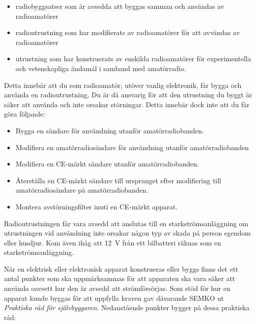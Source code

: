 \begin{itemize}
  \item radiobyggsatser som är avsedda att byggas samman och användas av
  radioamatörer
  \item radioutrustning som har modifierats av radioamatörer för att
  avvändas av radioamatörer
  \item utrustning som har konstruerats av enskilda radioamatörer för
  experimentella och vetenskapliga ändamål i samband med amatörradio.
\end{itemize}

Detta innebär att du som radioamatör, utöver vanlig elektronik, får bygga
och använda en radioutrustning.
Du är då ansvarig för att den utrustning du byggt är säker att använda och inte
orsakar störningar.
Detta innebär dock inte att du får göra följande:

\begin{itemize}
  \item Bygga en sändare för användning utanför amatörradiobanden.
  \item Modifiera en amatörradiosändare för användning utanför amatörradiobanden
  \item Modifiera en CE-märkt sändare utanför amatörradiobanden.
  \item Återställa en CE-märkt sändare till ursprunget efter modifiering till
    amatörradiosändare på amatörradiobanden.
  \item Montera avstörningsfilter inuti en CE-märkt apparat.
\end{itemize}

Radioutrustningen får vara avsedd att anslutas till en starkströmsanläggning
om utrustningen vid användning inte orsakar någon typ av skada på person
egendom eller husdjur.
Kom även ihåg att \qty{12}{\volt} från ett bilbatteri räknas som en
starkströmsanläggning.

När en elektrisk eller elektronisk apparat konstrueras eller byggs finns det
ett antal punkter som ska uppmärksammas för att apparaten ska vara säker att
använda oavsett hur den är avsedd att strömförsörjas.
Som stöd för hur en apparat kunde byggas för att uppfylla kraven gav
dåvarande SEMKO ut \emph{Praktiska råd för självbyggaren}.
Nedanstående punkter bygger på dessa praktiska råd:

